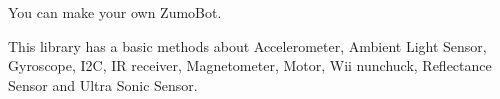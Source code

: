You can make your own Zumo\+Bot.

This library has a basic methods about Accelerometer, Ambient Light Sensor, Gyroscope, I2C, IR receiver, Magnetometer, Motor, Wii nunchuck, Reflectance Sensor and Ultra Sonic Sensor. 